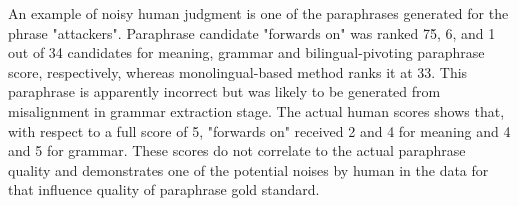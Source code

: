 \documentclass[11pt]{article}
\begin{document}
An example of noisy human judgment is one of the paraphrases generated for the phrase "attackers". Paraphrase candidate "forwards on" was ranked 7\.5, 6, and 1 out of 34 candidates for meaning, grammar and bilingual-pivoting paraphrase score, respectively, whereas monolingual-based method ranks it at 33. This paraphrase is apparently incorrect but was likely to be generated from misalignment in grammar extraction stage. The actual human scores shows that, with respect to a full score of 5, "forwards on" received 2 and 4 for meaning and 4 and 5 for grammar. These scores do not correlate to the actual paraphrase quality and demonstrates one of the potential noises by human in the data for that influence quality of paraphrase gold standard.
\end{document}
